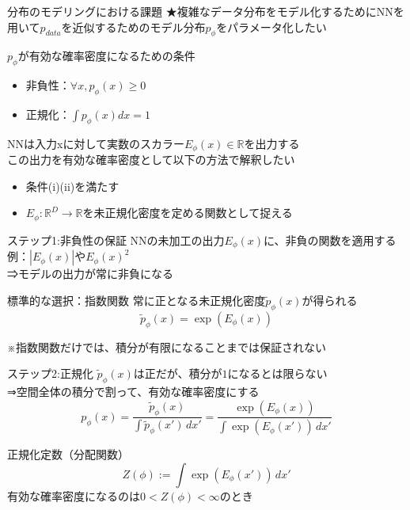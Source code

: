 \begin{frame}{分布のモデリングにおける課題}
    ★複雑なデータ分布をモデル化するためにNNを用いて$p_{data}$を近似するためのモデル分布$p_{\phi}$をパラメータ化したい\\
    \begin{block}{$p_{\phi}$が有効な確率密度になるための条件}
        \begin{itemize}
            \item[(i)] 非負性：$\forall x, p_{\phi}(x)\geq 0$
            \item[(ii)] 正規化：$\int p_{\phi}(x)dx=1$
        \end{itemize}
    \end{block}
    NNは入力xに対して実数のスカラー$\mathit{E}_{\phi}(x)\in \mathbb{R}$を出力する\\
    この出力を有効な確率密度として以下の方法で解釈したい\\
    \begin{itemize}
        \item[①] 条件(i)(ii)を満たす
        \item[②] $\mathit{E}_{\phi}:\mathbb{R}^D\to \mathbb{R}$を未正規化密度を定める関数として捉える
    \end{itemize}
\end{frame}
\begin{frame}{ステップ1:非負性の保証}
    NNの未加工の出力$\mathit{E}_{\phi}(x)$に、非負の関数を適用する\\
    例：$|\mathit{E}_{\phi}(x)|$や$\mathit{E}_{\phi}(x)^{2}$\\
    ⇒モデルの出力が常に非負になる
    \begin{exampleblock}{標準的な選択：指数関数}
        常に正となる未正規化密度$\widetilde{p}_{\phi}(x)$が得られる
        \[
            \widetilde{p}_{\phi}(x)=\exp(\mathit{E}_{\phi}(x))
        \]
    \end{exampleblock}
    \small ※指数関数だけでは、積分が有限になることまでは保証されない
\end{frame}
\begin{frame}{ステップ2:正規化}
    $\widetilde{p}_{\phi}(x)$は正だが、積分が$1$になるとは限らない\\
    ⇒空間全体の積分で割って、有効な確率密度にする
    \[
        p_{\phi}(x)
        =\frac{\widetilde{p}_{\phi}(x)}{\int\widetilde{p}_{\phi}(x')\,dx'}
        =\frac{\exp(\mathit{E}_{\phi}(x))}{\int\exp(\mathit{E}_{\phi}(x'))\,dx'}
    \]
    \begin{block}{正規化定数（分配関数）}
        \[
            Z(\phi):=\int\exp(\mathit{E}_{\phi}(x'))\,dx'
        \]
        有効な確率密度になるのは$0<Z(\phi)<\infty$のとき
    \end{block}
\end{frame}
